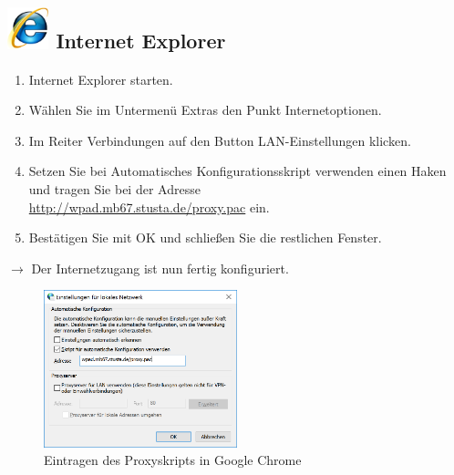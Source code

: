 \documentclass[a4paper,12pt]{scrartcl}
\begin{document}
\subsection*{\includegraphics[height=1.2cm,keepaspectratio]{Bilder/Internet_Explorer_7_Logo} Internet Explorer}
\begin{enumerate}
	\item Internet Explorer starten.
	\item Wählen Sie im Untermenü Extras den Punkt Internetoptionen.
	\item Im Reiter Verbindungen auf den Button LAN-Ein\-stellungen klicken.
	\item Setzen Sie bei Automatisches Konfigurationsskript verwenden einen Haken und tragen Sie bei der Adresse \\ \url{http://wpad.mb67.stusta.de/proxy.pac} ein.
	\item Bestätigen Sie mit OK und schließen Sie die restlichen Fenster.
\end{enumerate}
$\rightarrow$ Der Internetzugang ist nun fertig konfiguriert.


\newpage
\begin{figure}
	\vspace{-40pt}
	\begin{center}
		\includegraphics[width=0.5\textwidth,keepaspectratio]{Bilder/Proxy_IE_mb}
	\end{center}
	\caption{Eintragen des Proxyskripts in Google Chrome}
\end{figure}
\end{document}
